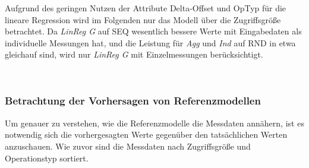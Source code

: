 \documentclass[
	12pt,
	a4paper,
	BCOR10mm,
	DIV14,
	listof=totoc,
	bibliography=totoc,
	headsepline
]{scrreprt}
\begin{document}
Aufgrund des geringen Nutzen der Attribute Delta-Offset und OpTyp für die lineare Regression wird im Folgenden nur das Modell über die Zugriffsgröße betrachtet.
Da \textit{LinReg G} auf SEQ wesentlich bessere Werte mit Eingabedaten als individuelle Messungen hat, und die Leistung für \textit{Agg} und \textit{Ind} auf RND in etwa gleichauf sind, wird nur \textit{LinReg G} mit Einzelmessungen berücksichtigt.\\

\begin{table}
	\centering
	\scriptsize
	 \\
	\caption{Ergebnisse der Referenzmodelle zu den Fehlermetriken}
	\label{tab:triv}
\end{table}

\subsubsection{Betrachtung der Vorhersagen von Referenzmodellen}
Um genauer zu verstehen, wie die Referenzmodelle die Messdaten annähern, ist es notwendig sich die vorhergesagten Werte gegenüber den tatsächlichen Werten anzuschauen.
Wie zuvor sind die Messdaten nach Zugriffsgröße und Operationstyp sortiert.\medskip
\end{document}
